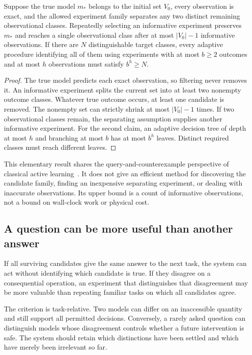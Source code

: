\begin{MUproposition}\label{MU:prop:queries}
Suppose the true model $m_*$ belongs to the initial set $V_0$, every observation is exact, and the allowed experiment family separates any two distinct remaining observational classes. Repeatedly selecting an informative experiment preserves $m_*$ and reaches a single observational class after at most $|V_0|-1$ informative observations. If there are $N$ distinguishable target classes, every adaptive procedure identifying all of them using experiments with at most $b\geq2$ outcomes and at most $h$ observations must satisfy $b^h\geq N$.
\end{MUproposition}
\begin{proof}
The true model predicts each exact observation, so filtering never removes it. An informative experiment splits the current set into at least two nonempty outcome classes. Whatever true outcome occurs, at least one candidate is removed. The nonempty set can strictly shrink at most $|V_0|-1$ times. If two observational classes remain, the separating assumption supplies another informative experiment. For the second claim, an adaptive decision tree of depth at most $h$ and branching at most $b$ has at most $b^h$ leaves. Distinct required classes must reach different leaves.
\end{proof}
This elementary result shares the query-and-counterexample perspective of classical active learning~\cite{MU:angluin}. It does not give an efficient method for discovering the candidate family, finding an inexpensive separating experiment, or dealing with inaccurate observations. Its upper bound is a count of informative observations, not a bound on wall-clock work or physical cost.

\subsection{A question can be more useful than another answer}
If all surviving candidates give the same answer to the next task, the system can act without identifying which candidate is true. If they disagree on a consequential operation, an experiment that distinguishes that disagreement may be more valuable than repeating familiar tasks on which all candidates agree.

The criterion is task-relative. Two models can differ on an inaccessible quantity and still support all permitted decisions. Conversely, a rarely asked question can distinguish models whose disagreement controls whether a future intervention is safe. The system should retain which distinctions have been settled and which have merely been irrelevant so far.

